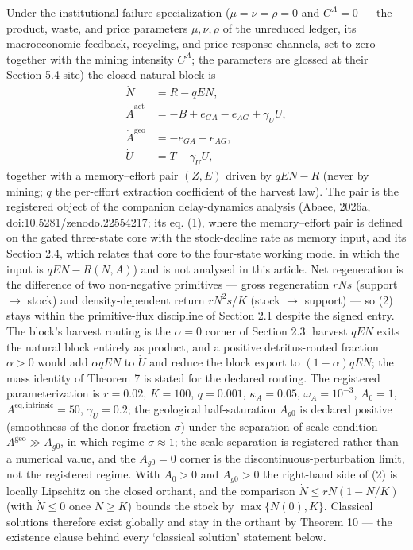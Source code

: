 \documentclass[11pt]{article}
\begin{document}
Under the institutional-failure specialization (\(\mu = \nu = \rho = 0\)
and \(C^A = 0\) --- the product, waste, and price parameters
\(\mu, \nu, \rho\) of the unreduced ledger, its macroeconomic-feedback,
recycling, and price-response channels, set to zero together with the
mining intensity \(C^A\); the parameters are glossed at their Section
5.4 site) the closed natural block is \[\begin{aligned}
\dot N &= R - qEN, \\
\dot A^{\mathrm{act}} &= -B + e_{GA} - e_{AG} + \gamma_U U, \\
\dot A^{\mathrm{geo}} &= -e_{GA} + e_{AG}, \\
\dot U &= T - \gamma_U U,
\end{aligned} \tag{2}\] together with a memory--effort pair \((Z, E)\)
driven by \(qEN - R\) (never by mining; \(q\) the per-effort extraction
coefficient of the harvest law). The pair is the registered object of
the companion delay-dynamics analysis (Abaee, 2026a, doi:10.5281/\allowbreak{}zenodo.22554217; its eq. (1), where the memory--effort pair is defined on the
gated three-state core with the stock-decline rate as memory input, and its Section 2.4, which relates that
core to the four-state working model in which the input is \(qEN - R(N, A)\)) and is not analysed in this
article. Net regeneration is the difference of two non-negative
primitives --- gross regeneration \(rNs\) (support \(\to\) stock) and
density-dependent return \(rN^2 s/\allowbreak{}K\) (stock \(\to\) support) --- so (2)
stays within the primitive-flux discipline of Section 2.1 despite the
signed entry. The block's harvest routing is the \(\alpha = 0\) corner
of Section 2.3: harvest \(qEN\) exits the natural block entirely as
product, and a positive detritus-routed fraction \(\alpha > 0\) would
add \(\alpha qEN\) to \(\dot U\) and reduce the block export to
\((1-\alpha)qEN\); the mass identity of Theorem 7 is stated for the
declared routing. The registered parameterization is \(r = 0.02\),
\(K = 100\), \(q = 0.001\), \(\kappa_A = 0.05\), \(\omega_A = 10^{-3}\),
\(A_0 = 1\), \(A^{\mathrm{eq,intrinsic}} = 50\), \(\gamma_U = 0.2\); the
geological half-saturation \(A_{g0}\) is declared positive (smoothness
of the donor fraction \(\sigma\)) under the separation-of-scale
condition \(A^{\mathrm{geo}} \gg A_{g0}\), in which regime
\(\sigma \approx 1\); the scale separation is registered rather than a
numerical value, and the \(A_{g0} = 0\) corner is the
discontinuous-perturbation limit, not the registered regime. With
\(A_0 > 0\) and \(A_{g0} > 0\) the right-hand side of (2) is locally
Lipschitz on the closed orthant, and the comparison
\(\dot N \le rN(1 - N/\allowbreak{}K)\) (with \(\dot N \le 0\) once \(N \ge K\))
bounds the stock by \(\max\{N(0), K\}\). Classical solutions therefore
exist globally and stay in the orthant by Theorem 10 --- the existence
clause behind every `classical solution' statement below.
\end{document}
